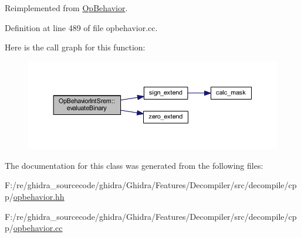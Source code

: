Reimplemented from \mbox{\hyperlink{class_op_behavior_aeeed3af7aa35264b31a1f182884214a9}{Op\+Behavior}}.



Definition at line 489 of file opbehavior.\+cc.

Here is the call graph for this function\+:
\nopagebreak
\begin{figure}[H]
\begin{center}
\leavevmode
\includegraphics[width=350pt]{class_op_behavior_int_srem_a6e65683da3dc1c0dbdf5d138519a9d85_cgraph}
\end{center}
\end{figure}


The documentation for this class was generated from the following files\+:\begin{DoxyCompactItemize}
\item 
F\+:/re/ghidra\+\_\+sourcecode/ghidra/\+Ghidra/\+Features/\+Decompiler/src/decompile/cpp/\mbox{\hyperlink{opbehavior_8hh}{opbehavior.\+hh}}\item 
F\+:/re/ghidra\+\_\+sourcecode/ghidra/\+Ghidra/\+Features/\+Decompiler/src/decompile/cpp/\mbox{\hyperlink{opbehavior_8cc}{opbehavior.\+cc}}\end{DoxyCompactItemize}
